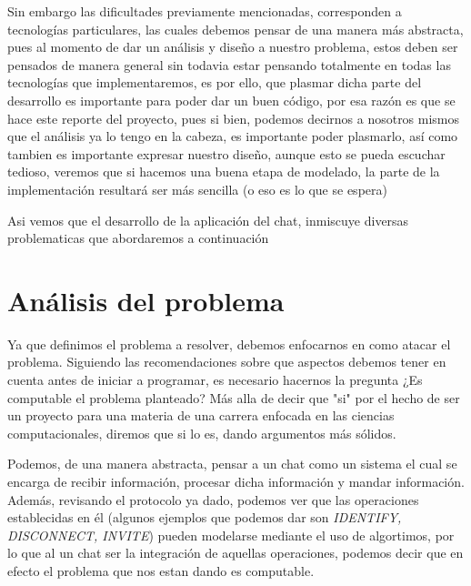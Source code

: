\documentclass[10pt,letterpaper]{report}
\begin{document}
\vspace{0.2 cm}

\noindent Sin embargo las dificultades previamente mencionadas, corresponden a tecnologías particulares, las cuales debemos pensar de una manera más abstracta, pues al momento de dar un análisis y diseño  a nuestro problema, estos deben ser pensados de manera general sin todavia estar pensando totalmente en todas las tecnologías que implementaremos, es por ello, que plasmar dicha parte del desarrollo es importante para poder dar un buen código, por esa razón es que se hace este reporte del proyecto, pues si bien, podemos decirnos a nosotros mismos que el análisis ya lo tengo en la cabeza, es importante poder plasmarlo, así como tambien es importante expresar nuestro diseño, aunque esto se pueda escuchar tedioso, veremos que si hacemos una buena etapa de modelado, la parte de la implementación resultará ser más sencilla (o eso es lo que se espera)

\vspace{0.2 cm}

\noindent Asi vemos que el desarrollo de la aplicación del chat, inmiscuye diversas problematicas que abordaremos a continuación

\vspace{0.2cm}




    \chapter{Análisis del problema}


\noindent Ya que definimos el problema a resolver, debemos enfocarnos en como atacar el problema. Siguiendo las recomendaciones sobre que aspectos debemos tener en cuenta antes de iniciar a programar, es necesario hacernos la pregunta ¿Es computable el problema planteado? Más alla de decir que "si" por el hecho de ser un proyecto para una materia de una carrera enfocada en las ciencias computacionales, diremos que si lo es, dando argumentos más sólidos. 

\vspace{0.5cm}

\noindent Podemos, de una manera abstracta, pensar a un chat como un sistema el cual se encarga de recibir información, procesar dicha información y mandar información. Además, revisando el protocolo ya dado, podemos ver que las operaciones establecidas en él (algunos ejemplos que podemos dar son  \textit{IDENTIFY, DISCONNECT, INVITE}) pueden modelarse mediante el uso de algortimos, por lo que al un chat ser la integración de aquellas operaciones, podemos decir que en efecto el problema que nos estan dando es computable.
\end{document}
